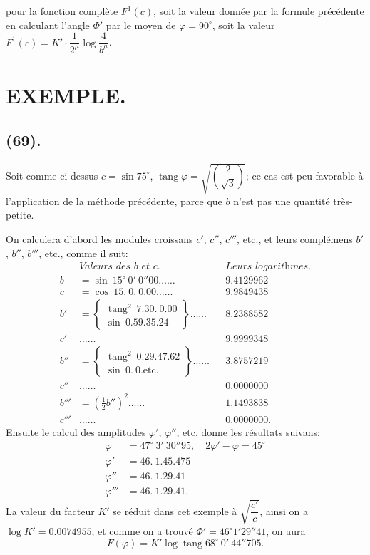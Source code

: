 \documentclass{article}
\begin{document}
pour la fonction complète $F^{1}(c)$, soit la valeur donnée par la formule précédente en calculant l'angle $\Phi'$ par le moyen de $\varphi=90^{\circ}$, soit la valeur $F^{1}(c)=K'\cdot\dfrac{1}{2^{\mu}}\log\dfrac{4}{b^{\mu}}$.

\section*{EXEMPLE.}

\subsection*{(69).}

Soit comme ci-dessus $c=\sin75^{\circ}$, $\operatorname{tang}\varphi=\sqrt{\left(\dfrac{2}{\sqrt{3}}\right)}$; ce cas est peu favorable à l'application de la méthode précédente, parce que $b$ n'est pas une quantité très-petite.

On calculera d'abord les modules croissans $c'$, $c''$, $c'''$, etc., et leurs complémens $b'$, $b''$, $b'''$, etc., comme il suit:
\[ \begin{aligned} &\textit{Valeurs des b et c.} && \textit{Leurs logarithmes.}\\ b&=\sin\ 15^{\circ}\ 0'\ 0''00\ldots\ldots && 9.4129962\\ c&=\cos\ 15.\ 0.\ 0.00\ldots\ldots && 9.9849438\\ b'&=\left\{\begin{array}{l}\operatorname{tang}^{2}\ 7.30.\ 0.00\\ \sin\ 0.59.35.24\end{array}\right\}\ldots\ldots && 8.2388582\\ c'&\ldots\ldots && 9.9999348\\ b''&=\left\{\begin{array}{l}\operatorname{tang}^{2}\ 0.29.47.62\\ \sin\ 0.\ 0.\text{etc.}\end{array}\right\}\ldots\ldots && 3.8757219\\ c''&\ldots\ldots && 0.0000000\\ b'''&=(\tfrac{1}{2}b'')^{2}\ldots\ldots && 1.1493838\\ c'''&\ldots\ldots && 0.0000000. \end{aligned} \]
Ensuite le calcul des amplitudes $\varphi'$, $\varphi''$, etc. donne les résultats suivans:
\[ \begin{aligned} \varphi&=47^{\circ}\ 3'\ 30''95,\quad 2\varphi'-\varphi=45^{\circ}\\ \varphi'&=46.\ 1.45.475\\ \varphi''&=46.\ 1.29.41\\ \varphi'''&=46.\ 1.29.41. \end{aligned} \]
La valeur du facteur $K'$ se réduit dans cet exemple à $\sqrt{\dfrac{c'}{c}}$, ainsi on a $\log K'=0.0074955$; et comme on a trouvé $\Phi'=46^{\circ}1'29''41$, on aura
\[ F(\varphi)=K'\log\operatorname{tang}68^{\circ}\ 0'\ 44''705. \]
\end{document}
